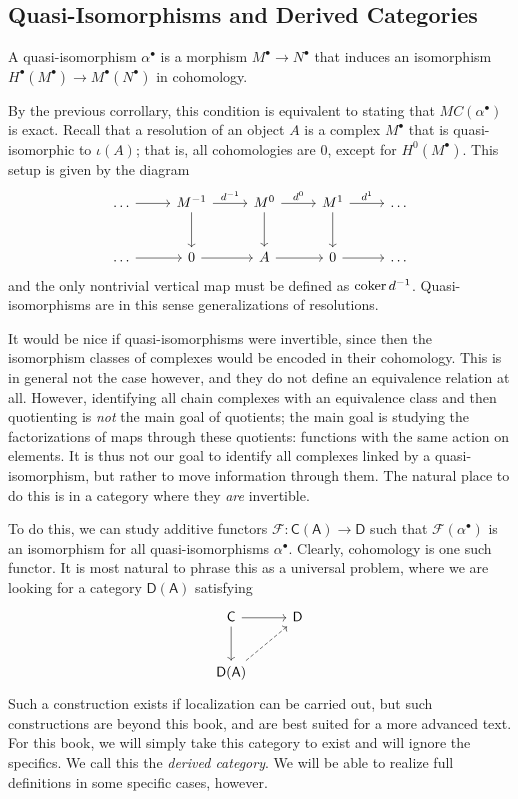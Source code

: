 \subsection{Quasi-Isomorphisms and Derived Categories}
\begin{definition}\label{dfn:9.4.2}
	A quasi-isomorphism $\alpha ^\bullet $ is a morphism $M^\bullet \to N^\bullet $ that induces an isomorphism $H^\bullet (M^\bullet )\to M^\bullet (N^\bullet )$ in cohomology.
\end{definition}
By the previous corrollary, this condition is equivalent to stating that $MC(\alpha ^\bullet )$ is exact. Recall that a resolution of an object $A$ is a complex $M^\bullet $ that is quasi-isomorphic to $\iota (A)$; that is, all cohomologies are 0, except for $H^0(M^\bullet )$. This setup is given by the diagram
\[\begin{tikzcd}[row sep = 2.5em, column sep = 2.5em]
	\ldots \ar[r]&M^{-1} \ar[r, "d^{-1} "]\ar[d]&M^0\ar[d]\ar[r, "d^{0} "]&M^{1} \ar[r, "d^{1} "]\ar[d]&\ldots \\
	\ldots \ar[r]&0\ar[r]&A\ar[r]&0\ar[r]&\ldots 
\end{tikzcd}\]
and the only nontrivial vertical map must be defined as $\operatorname{coker} d^{-1} $. Quasi-isomorphisms are in this sense generalizations of resolutions.

It would be nice if quasi-isomorphisms were invertible, since then the isomorphism classes of complexes would be encoded in their cohomology. This is in general not the case however, and they do not define an equivalence relation at all. However, identifying all chain complexes with an equivalence class and then quotienting is \emph{not} the main goal of quotients; the main goal is studying the factorizations of maps through these quotients: functions with the same action on elements. It is thus not our goal to identify all complexes linked by a quasi-isomorphism, but rather to move information through them. The natural place to do this is in a category where they \emph{are} invertible.

To do this, we can study additive functors $\mathscr{F} : \mathsf{C} (\mathsf{A} ) \to \mathsf{D} $ such that $\mathscr{F} (\alpha ^\bullet )$ is an isomorphism for all quasi-isomorphisms $\alpha ^\bullet $. Clearly, cohomology is one such functor. It is most natural to phrase this as a universal problem, where we are looking for a category $\mathsf{D} (\mathsf{A} )$ satisfying
\[\begin{tikzcd}[row sep = 2.5em, column sep = 2.5em]
	\mathsf{C} \ar[r]\ar[d]&\mathsf{D} \\
	\mathsf{D} (\mathsf{A} )\ar[ur, dashed]
\end{tikzcd}\]
Such a construction exists if localization can be carried out, but such constructions are beyond this book, and are best suited for a more advanced text. For this book, we will simply take this category to exist and will ignore the specifics. We call this the \emph{derived category}. We will be able to realize full definitions in some specific cases, however.

